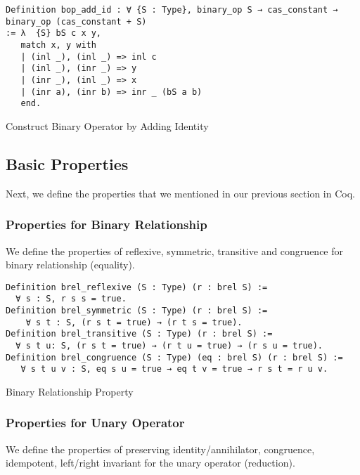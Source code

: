 \begin{listing}[H]
\begin{verbatim}
Definition bop_add_id : ∀ {S : Type}, binary_op S → cas_constant → binary_op (cas_constant + S)
:= λ  {S} bS c x y, 
   match x, y with
   | (inl _), (inl _) => inl c 
   | (inl _), (inr _) => y
   | (inr _), (inl _) => x
   | (inr a), (inr b) => inr _ (bS a b)
   end.
\end{verbatim}
\caption{Construct Binary Operator by Adding Identity} 
\label{coq:def:add_const_ann}
\end{listing}

\subsection{Basic Properties}

Next, we define the properties that we mentioned in our previous section in Coq.

\subsubsection{Properties for Binary Relationship}
We define the properties of reflexive, symmetric, transitive and congruence for binary relationship (equality).

\begin{listing}[H]
\begin{verbatim}
Definition brel_reflexive (S : Type) (r : brel S) :=
  ∀ s : S, r s s = true.
Definition brel_symmetric (S : Type) (r : brel S) := 
    ∀ s t : S, (r s t = true) → (r t s = true). 
Definition brel_transitive (S : Type) (r : brel S) := 
  ∀ s t u: S, (r s t = true) → (r t u = true) → (r s u = true).
Definition brel_congruence (S : Type) (eq : brel S) (r : brel S) := 
   ∀ s t u v : S, eq s u = true → eq t v = true → r s t = r u v.
\end{verbatim}
\caption{Binary Relationship Property} 
\label{coq:def:brel_properties}
\end{listing}

\subsubsection{Properties for Unary Operator}
We define the properties of preserving identity/annihilator, congruence, idempotent, left/right invariant for the unary operator (reduction).

